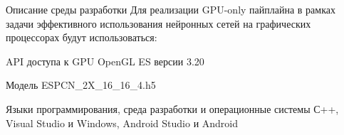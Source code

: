 \documentclass[aspectratio=169,xcolor=dvipsnames]{beamer}
\begin{document}
\begin{frame}{Описание среды разработки}
    Для реализации GPU-only пайплайна в рамках задачи эффективного использования нейронных сетей на графических процессорах будут использоваться:
    
    \begin{block}{API доступа к GPU}
        OpenGL ES версии 3.20
    \end{block}

    \begin{block}{Модель}
        ESPCN\_2X\_16\_16\_4.h5
    \end{block}

    \begin{block}{Языки программирования, среда разработки и операционные системы}
        С++, Visual Studio и Windows, Android Studio и Android
    \end{block}
\end{frame}

\end{document}
